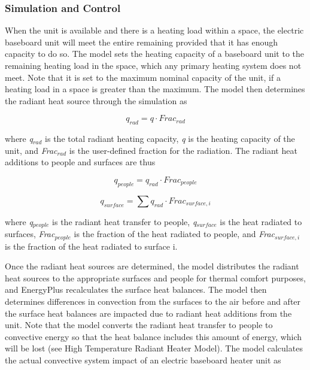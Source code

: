 \subsubsection{Simulation and Control}\label{simulation-and-control-002}

When the unit is available and there is a heating load within a space, the electric baseboard unit will meet the entire remaining provided that it has enough capacity to do so. The model sets the heating capacity of a baseboard unit to the remaining heating load in the space, which any primary heating system does not meet. Note that it is set to the maximum nominal capacity of the unit, if a heating load in a space is greater than the maximum. The model then determines the radiant heat source through the simulation as

\begin{equation}
{q_{rad}} = q \cdot Fra{c_{rad}}
\end{equation}

where \emph{q\(_{rad}\)} is the total radiant heating capacity, \emph{q} is the heating capacity of the unit, and \emph{Frac\(_{rad}\)} is the user-defined fraction for the radiation. The radiant heat additions to people and surfaces are thus

\begin{equation}
{q_{people}} = {q_{rad}} \cdot Fra{c_{people}}
\end{equation}

\begin{equation}
{q_{surface}} = \sum {{q_{rad}} \cdot Fra{c_{surface,i}}}
\end{equation}

where \emph{q\(_{people}\)} is the radiant heat transfer to people, \emph{q\(_{surface}\)} is the heat radiated to surfaces, \emph{Frac\(_{people}\)} is the fraction of the heat radiated to people, and \emph{Frac\(_{surface,i}\)} is the fraction of the heat radiated to surface i.

Once the radiant heat sources are determined, the model distributes the radiant heat sources to the appropriate surfaces and people for thermal comfort purposes, and EnergyPlus recalculates the surface heat balances. The model then determines differences in convection from the surfaces to the air before and after the surface heat balances are impacted due to radiant heat additions from the unit. Note that the model converts the radiant heat transfer to people to convective energy so that the heat balance includes this amount of energy, which will be lost (see High Temperature Radiant Heater Model). The model calculates the actual convective system impact of an electric baseboard heater unit as

